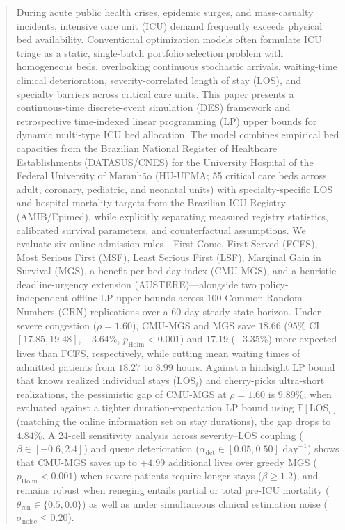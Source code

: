 \documentclass[final,5p,times,twocolumn]{elsarticle}
\begin{document}
\begin{frontmatter}
\begin{abstract}
During acute public health crises, epidemic surges, and mass-casualty incidents, intensive care unit (ICU) demand frequently exceeds physical bed availability. Conventional optimization models often formulate ICU triage as a static, single-batch portfolio selection problem with homogeneous beds, overlooking continuous stochastic arrivals, waiting-time clinical deterioration, severity-correlated length of stay (LOS), and specialty barriers across critical care units. This paper presents a continuous-time discrete-event simulation (DES) framework and retrospective time-indexed linear programming (LP) upper bounds for dynamic multi-type ICU bed allocation. The model combines empirical bed capacities from the Brazilian National Register of Healthcare Establishments (DATASUS/CNES) for the University Hospital of the Federal University of Maranh\~ao (HU-UFMA; 55 critical care beds across adult, coronary, pediatric, and neonatal units) with specialty-specific LOS and hospital mortality targets from the Brazilian ICU Registry (AMIB/Epimed), while explicitly separating measured registry statistics, calibrated survival parameters, and counterfactual assumptions. We evaluate six online admission rules---First-Come, First-Served (FCFS), Most Serious First (MSF), Least Serious First (LSF), Marginal Gain in Survival (MGS), a benefit-per-bed-day index (CMU-MGS), and a heuristic deadline-urgency extension (AUSTERE)---alongside two policy-independent offline LP upper bounds across 100 Common Random Numbers (CRN) replications over a 60-day steady-state horizon. Under severe congestion ($\rho = 1.60$), CMU-MGS and MGS save $18.66$ ($95\%$ CI $[17.85, 19.48]$, $+3.64\%$, $p_{\text{Holm}} < 0.001$) and $17.19$ ($+3.35\%$) more expected lives than FCFS, respectively, while cutting mean waiting times of admitted patients from $18.27$ to $8.99$ hours. Against a hindsight LP bound that knows realized individual stays ($\text{LOS}_i$) and cherry-picks ultra-short realizations, the pessimistic gap of CMU-MGS at $\rho = 1.60$ is $9.89\%$; when evaluated against a tighter duration-expectation LP bound using $\mathbb{E}[\text{LOS}_i]$ (matching the online information set on stay durations), the gap drops to $4.84\%$. A 24-cell sensitivity analysis across severity--LOS coupling ($\beta \in [-0.6, 2.4]$) and queue deterioration ($\alpha_{\text{det}} \in [0.05, 0.50]\text{ day}^{-1}$) shows that CMU-MGS saves up to $+4.99$ additional lives over greedy MGS ($p_{\text{Holm}} < 0.001$) when severe patients require longer stays ($\beta \ge 1.2$), and remains robust when reneging entails partial or total pre-ICU mortality ($\theta_{\text{ren}} \in \{0.5, 0.0\}$) as well as under simultaneous clinical estimation noise ($\sigma_{\text{noise}} \le 0.20$).
\end{abstract}


\end{frontmatter}
\end{document}
